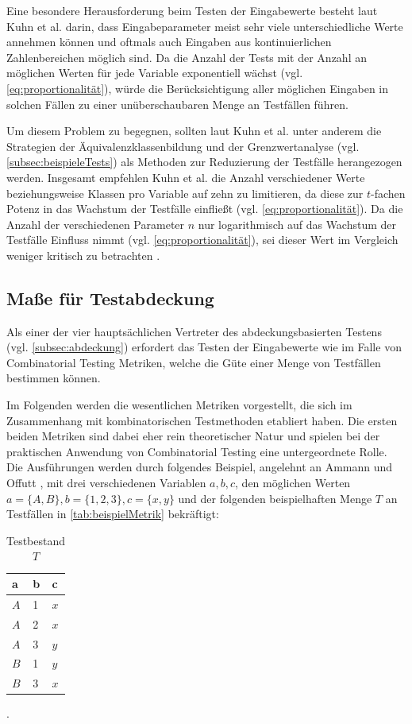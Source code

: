 Eine besondere Herausforderung beim Testen der Eingabewerte besteht laut Kuhn et al. \cite{kuhn2010practical} darin, dass Eingabeparameter meist sehr viele unterschiedliche Werte annehmen können und oftmals auch Eingaben aus kontinuierlichen Zahlenbereichen möglich sind. Da die Anzahl der Tests mit der Anzahl an möglichen Werten für jede Variable exponentiell wächst (vgl. \autoref{eq:proportionalität}), würde die Berücksichtigung aller möglichen Eingaben in solchen Fällen zu einer unüberschaubaren Menge an Testfällen führen. 

Um diesem Problem zu begegnen, sollten laut Kuhn et al. \cite{kuhn2010practical} unter anderem die Strategien der Äquivalenzklassenbildung und der Grenzwertanalyse (vgl. \autoref{subsec:beispieleTests}) als Methoden zur Reduzierung der Testfälle herangezogen werden. Insgesamt empfehlen Kuhn et al. \cite{kuhn2010practical} die Anzahl verschiedener Werte beziehungsweise Klassen pro Variable auf zehn zu limitieren, da diese zur $t$-fachen Potenz in das Wachstum der Testfälle einfließt (vgl. \autoref{eq:proportionalität}). Da die Anzahl der verschiedenen Parameter $n$ nur logarithmisch auf das Wachstum der Testfälle Einfluss nimmt (vgl. \autoref{eq:proportionalität}), sei dieser Wert im Vergleich weniger kritisch zu betrachten \cite{kuhn2010practical}.

\subsection{Maße für Testabdeckung}\label{subsec:masse}

Als einer der vier hauptsächlichen Vertreter des abdeckungsbasierten Testens (vgl. \autoref{subsec:abdeckung}) erfordert das Testen der Eingabewerte wie im Falle von Combinatorial Testing Metriken, welche die Güte einer Menge von Testfällen bestimmen können.

Im Folgenden werden die wesentlichen Metriken vorgestellt, die sich im Zusammenhang mit kombinatorischen Testmethoden etabliert haben. Die ersten beiden Metriken sind dabei eher rein theoretischer Natur und spielen bei der praktischen Anwendung von Combinatorial Testing eine untergeordnete Rolle. Die Ausführungen werden durch folgendes Beispiel, angelehnt an Ammann und Offutt \cite[S. 160 ff.]{ammann2008introduction}, mit drei verschiedenen Variablen $a,b,c$, den möglichen Werten $a = \{A,B\}, b = \{1,2,3\}, c = \{x,y\}$ und der folgenden beispielhaften Menge $T$ an Testfällen in \autoref{tab:beispielMetrik} bekräftigt:
\begin{table}[h!]
\begin{tabular}{|l|l|l|}
\cellcolor{grauinfo}a   & \cellcolor{grauinfo}b & \cellcolor{grauinfo}c   \\ \hline
$A$ & 1 & $x$ \\ \hline
$A$ & 2 & $x$ \\ \hline
$A$ & 3 & $y$ \\ \hline
$B$ & 1 & $y$ \\ \hline
$B$ & 3 & $x$ \\ \hline
\end{tabular}
\caption{Testbestand $T$}.
\label{tab:beispielMetrik}
\end{table}
 

